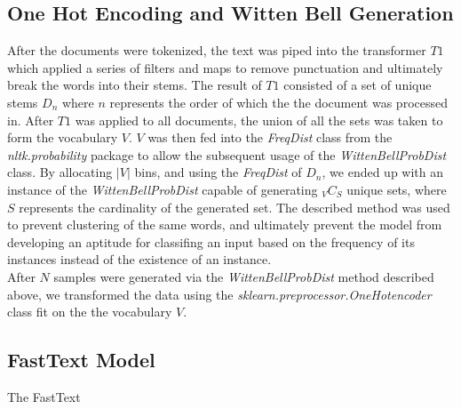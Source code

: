 \documentclass[12pt]{report}
\begin{document}
\subsection{One Hot Encoding and Witten Bell Generation} 
After the documents were tokenized, the text was piped into the transformer $T1$ which applied a
series of filters and maps to remove punctuation and ultimately break the words
into their stems. The result of $T1$ consisted of a set of unique stems $D_n$
where $n$ represents the order of which the the document was processed in.
After $T1$ was applied to all documents, the union of all the sets was taken to
form the vocabulary $V$. $V$ was then fed into the \emph{FreqDist} class from
the \emph{nltk.probability} package to allow the subsequent usage of the
\emph{WittenBellProbDist} class. By allocating $|V|$ bins, and using the
\emph{FreqDist} of $D_n$, we ended up with an instance of the
\emph{WittenBellProbDist} capable of generating ${}_{V}C_{S}$ unique sets,
where $S$ represents the cardinality of the generated set. The described method
was used to prevent clustering of the same words, and ultimately prevent the
model from developing an aptitude for classifing an input based on the
frequency of its instances instead of the existence of an instance.\\

After $N$ samples were generated via the \emph{WittenBellProbDist} method
described above, we transformed the data using the
\emph{sklearn.preprocessor.OneHotencoder} class fit on the the vocabulary $V$.

\subsection{FastText Model}
The FastText
\end{document}
